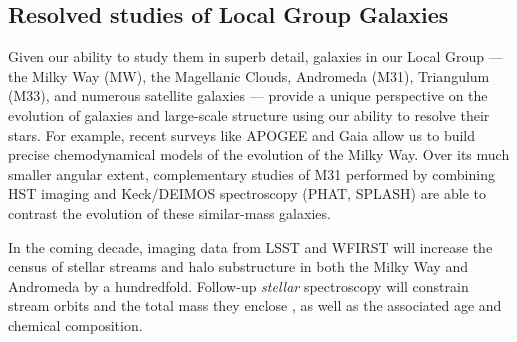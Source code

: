 
\subsection{Resolved studies of Local Group Galaxies}
\label{sec:localgroup}

Given our ability to study them in superb detail, galaxies in our
Local Group --- the Milky Way (MW), the Magellanic Clouds, Andromeda
(M31), Triangulum (M33), and numerous satellite galaxies --- provide
a unique perspective on the evolution of galaxies and large-scale
structure using our ability to resolve their stars. For example,
recent surveys like APOGEE and Gaia allow us to build precise
chemodynamical models of the evolution of the Milky Way. Over its
much smaller angular extent, complementary studies of M31 performed
by combining HST imaging and Keck/DEIMOS spectroscopy (PHAT, SPLASH)
are able to contrast the evolution of these similar-mass galaxies.


In the coming decade, imaging data from LSST and WFIRST will
increase the census of stellar streams and halo substructure in both
the Milky Way and Andromeda by a hundredfold. Follow-up
\emph{stellar} spectroscopy will constrain stream orbits and the
total mass they enclose \citep{2017ApJ...836..234S}, as well as the
associated age and chemical composition.

\noindent{}

\noindent{}


